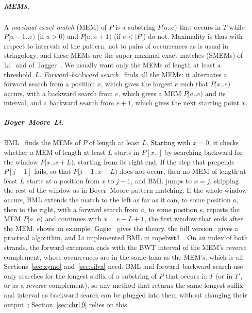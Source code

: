 \subparagraph*{MEMs.}
A \emph{maximal exact match} (MEM) of $P$ is a substring $P[a..e)$ that occurs in $T$ while $P[a - 1..e)$ (if $a > 0$) and $P[a..e + 1)$ (if $e < |P|$) do not.
Maximality is thus with respect to intervals of the pattern, not to pairs of occurrences as is usual in stringology, and these MEMs are the super-maximal exact matches (SMEMs) of Li~\cite{Li2012} and of Tagger~\cite{DAF+25}.
We usually want only the MEMs of length at least a threshold~$L$.
\emph{Forward--backward search}~\cite{Li2012} finds all the MEMs: it alternates a forward search from a position $x$, which gives the largest $e$ such that $P[x..e)$ occurs, with a backward search from $e$, which gives a MEM $P[a..e)$ and its interval, and a backward search from $e + 1$, which gives the next starting point $x$.

\subparagraph*{Boyer--Moore--Li.}
BML~\cite{Gagie2024BML,Li2024} finds the MEMs of $P$ of length at least $L$.
Starting with $x = 0$, it checks whether a MEM of length at least $L$ starts in $P[x..]$ by searching backward for the window $P[x..x + L)$, starting from its right end.
If the step that prepends $P[j - 1]$ fails, so that $P[j - 1..x + L)$ does not occur, then no MEM of length at least $L$ starts at a position from $x$ to $j - 1$, and BML jumps to $x = j$, skipping the rest of the window as in Boyer--Moore pattern matching.
If the whole window occurs, BML extends the match to the left as far as it can, to some position $a$, then to the right, with a forward search from $a$, to some position $e$, reports the MEM $P[a..e)$ and continues with $x = e - L + 1$, the first window that ends after the MEM.
 shows an example.
Gagie~\cite{Gagie2024BML} gives the theory, the full version~\cite{Gag24arxiv} gives a practical algorithm, and Li implemented BML in ropebwt3~\cite{Li2024}.
On an index of both strands, the forward extension ends with the BWT interval of the MEM's reverse complement, whose occurrences are in the same taxa as the MEM's, which is all Sections~\ref{sec:zymo} and~\ref{sec:silva} need.
BML and forward--backward search use only searches for the longest suffix of a substring of $P$ that occurs in $T$ (or in $T'$, or as a reverse complement), so any method that returns the same longest suffix and interval as backward search can be plugged into them without changing their output~\cite{Gagie2024BML}; Section~\ref{sec:chr19} relies on this.

